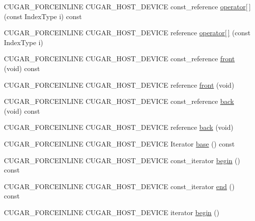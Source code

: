 \begin{DoxyCompactItemize}
\item 
C\+U\+G\+A\+R\+\_\+\+F\+O\+R\+C\+E\+I\+N\+L\+I\+NE C\+U\+G\+A\+R\+\_\+\+H\+O\+S\+T\+\_\+\+D\+E\+V\+I\+CE const\+\_\+reference \hyperlink{structcugar_1_1vector__view_a0fda103573e609c8c62592067806fc86}{operator\mbox{[}$\,$\mbox{]}} (const Index\+Type i) const
\item 
C\+U\+G\+A\+R\+\_\+\+F\+O\+R\+C\+E\+I\+N\+L\+I\+NE C\+U\+G\+A\+R\+\_\+\+H\+O\+S\+T\+\_\+\+D\+E\+V\+I\+CE reference \hyperlink{structcugar_1_1vector__view_a3b474a8603160454c4de16fd506e0f61}{operator\mbox{[}$\,$\mbox{]}} (const Index\+Type i)
\item 
C\+U\+G\+A\+R\+\_\+\+F\+O\+R\+C\+E\+I\+N\+L\+I\+NE C\+U\+G\+A\+R\+\_\+\+H\+O\+S\+T\+\_\+\+D\+E\+V\+I\+CE const\+\_\+reference \hyperlink{structcugar_1_1vector__view_a011678a732fc8f46d65b65b1cb4ed466}{front} (void) const
\item 
C\+U\+G\+A\+R\+\_\+\+F\+O\+R\+C\+E\+I\+N\+L\+I\+NE C\+U\+G\+A\+R\+\_\+\+H\+O\+S\+T\+\_\+\+D\+E\+V\+I\+CE reference \hyperlink{structcugar_1_1vector__view_aba41f15593f52d248d7d525c152ba124}{front} (void)
\item 
C\+U\+G\+A\+R\+\_\+\+F\+O\+R\+C\+E\+I\+N\+L\+I\+NE C\+U\+G\+A\+R\+\_\+\+H\+O\+S\+T\+\_\+\+D\+E\+V\+I\+CE const\+\_\+reference \hyperlink{structcugar_1_1vector__view_a45c3064a266bf5685e7963970d72fc48}{back} (void) const
\item 
C\+U\+G\+A\+R\+\_\+\+F\+O\+R\+C\+E\+I\+N\+L\+I\+NE C\+U\+G\+A\+R\+\_\+\+H\+O\+S\+T\+\_\+\+D\+E\+V\+I\+CE reference \hyperlink{structcugar_1_1vector__view_a2a03b86aef7a40e55d7c7e052c94af6b}{back} (void)
\item 
C\+U\+G\+A\+R\+\_\+\+F\+O\+R\+C\+E\+I\+N\+L\+I\+NE C\+U\+G\+A\+R\+\_\+\+H\+O\+S\+T\+\_\+\+D\+E\+V\+I\+CE Iterator \hyperlink{structcugar_1_1vector__view_a0a8acdcfb98a8559b3870c685f496349}{base} () const
\item 
C\+U\+G\+A\+R\+\_\+\+F\+O\+R\+C\+E\+I\+N\+L\+I\+NE C\+U\+G\+A\+R\+\_\+\+H\+O\+S\+T\+\_\+\+D\+E\+V\+I\+CE const\+\_\+iterator \hyperlink{structcugar_1_1vector__view_a20919196546a2644a43b3298d7da67ce}{begin} () const
\item 
C\+U\+G\+A\+R\+\_\+\+F\+O\+R\+C\+E\+I\+N\+L\+I\+NE C\+U\+G\+A\+R\+\_\+\+H\+O\+S\+T\+\_\+\+D\+E\+V\+I\+CE const\+\_\+iterator \hyperlink{structcugar_1_1vector__view_ac19bc3ea1579b22053d0a91998026bc8}{end} () const
\item 
C\+U\+G\+A\+R\+\_\+\+F\+O\+R\+C\+E\+I\+N\+L\+I\+NE C\+U\+G\+A\+R\+\_\+\+H\+O\+S\+T\+\_\+\+D\+E\+V\+I\+CE iterator \hyperlink{structcugar_1_1vector__view_a5067c45d339f1062d3dceef8135d2d2a}{begin} ()

\end{DoxyCompactItemize}
